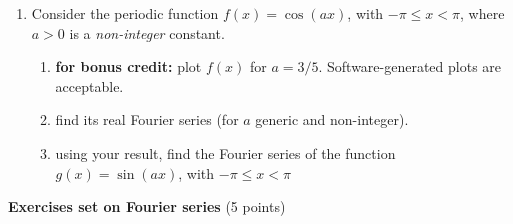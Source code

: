 \documentclass[fleqn]{article}
\begin{document}
\begin{enumerate}
  \item Consider the periodic function $f(x)=\cos(ax)$, with $-\pi \leq x < \pi$, where $a>0$ is a \emph{non-integer} constant. 
    \begin{enumerate}
    \item {\bf  for bonus credit:}  plot $f(x)$ for $a=3/5$. Software-generated plots are acceptable. 

    \item find its real Fourier series (for $a$ generic and non-integer).

    \item using your result, find the Fourier series of the function  $g(x)=\sin(ax)$, with $-\pi \leq x < \pi$
    \end{enumerate}
\end{enumerate}

\pagebreak

\textbf{Exercises set on Fourier series} (5 points)
\end{document}

